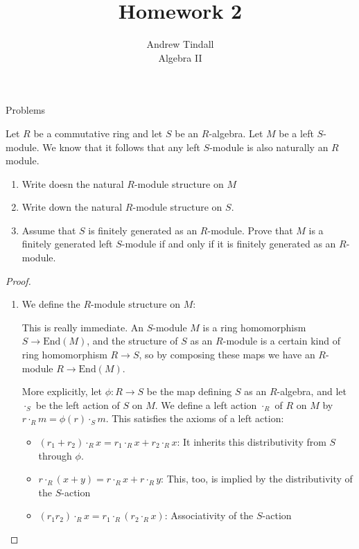\documentclass[12pt]{article}
\theoremstyle{definition}
\newenvironment{problem}[2][Problem]{\begin{trivlist}
\item[\hskip \labelsep {\bfseries #1}\hskip \labelsep {\bfseries #2.}]}{\end{trivlist}}
\begin{document}
 
 
\title{Homework 2}
\author{Andrew Tindall\\
	Algebra II}
 
\maketitle
\begin{section}{Problems}
	\begin{problem}{1}
	Let $R$ be a commutative ring and let $S$ be an $R$-algebra. Let $M$ be a left $S$-module. We know that it follows that any left $S$-module is also naturally an $R$ module.
	\begin{enumerate}[label=(\alph*)]
		\item Write doesn the natural $R$-module structure on $M$
		\item Write down the natural $R$-module structure on $S$.
		\item Assume that $S$ is finitely generated as an $R$-module. Prove that $M$ is a finitely generated left $S$-module if and only if it is finitely generated as an $R$-module.
	\end{enumerate}
\end{problem}
\begin{proof}
	\begin{enumerate}[label=(\alph*)]
		\item We define the $R$-module structure on $M$:
			\par This is really immediate. An $S$-module $M$ is a ring homomorphism $S \to \text{End}(M)$, and the structure of $S$ as an $R$-module is a certain kind of ring homomorphism $R \to S$, so by composing these maps we have an $R$-module $R \to \text{End}(M)$.
			\par More explicitly, let $\phi: R \to S$ be the map defining $S$ as an $R$-algebra, and let $\cdot_S$ be the left action of $S$ on $M$. We define a left action $\cdot_R$ of $R$ on $M$ by $r \cdot_R m = \phi(r) \cdot_S m$. This satisfies the axioms of a left action:
			\begin{itemize}
				\item $(r_1 + r_2) \cdot_R x = r_1 \cdot_R x + r_2 \cdot_R x$: It inherits this distributivity from $S$ through $\phi$.
				\item $r \cdot_R (x+y) = r\cdot_R x + r\cdot_R y$: This, too, is implied by the distributivity of the $S$-action
				\item $(r_1r_2) \cdot_R x = r_1\cdot_R (r_2 \cdot_R x)$: Associativity of the $S$-action

\end{itemize}
\end{enumerate}
\end{proof}
\end{section}
\end{document}
